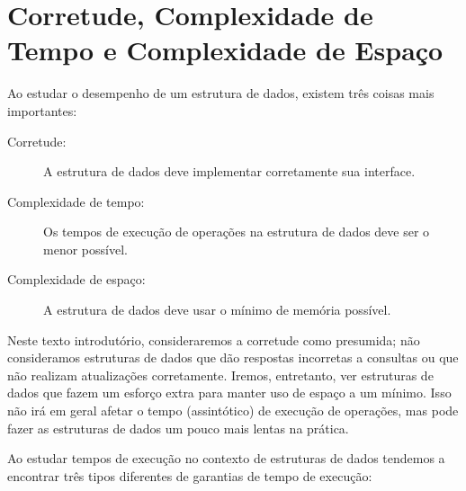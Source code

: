 \section{Corretude, Complexidade de Tempo e Complexidade de Espaço}

Ao estudar o desempenho de um estrutura de dados, existem três coisas mais importantes:

\begin{description}
  \item[Corretude:] A estrutura de dados deve implementar corretamente sua interface. 
  \item[Complexidade de tempo:] Os tempos de execução de operações na estrutura de dados deve ser o menor possível. 
  \item[Complexidade de espaço:] A estrutura de dados deve usar o mínimo de memória possível.
\end{description}


Neste texto introdutório, consideraremos a corretude como presumida; não consideramos estruturas de dados que dão respostas incorretas a consultas ou que não realizam atualizações corretamente. Iremos, entretanto, ver estruturas de dados que fazem um esforço extra para manter uso de espaço a um mínimo.
Isso não irá em geral afetar o tempo (assintótico) de execução de operações, mas pode fazer as estruturas de dados um pouco mais lentas na prática.

Ao estudar tempos de execução no contexto de estruturas de dados tendemos a encontrar três tipos diferentes de garantias de tempo de execução:

